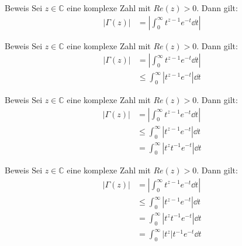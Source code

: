 \documentclass[10pt]{beamer}
\def\bC{\mathbb{C}}
\begin{document}
\begin{frame}{Beweis}
    Sei \( z \in \bC \) eine komplexe Zahl mit \( Re(z) > 0 \). Dann gilt:
    \begin{align*}
        \left\vert \Gamma( z ) \right\vert
        & = \left\vert \int_{0}^{\infty} t^{z - 1} e^{-t} \dd{t} \right\vert
    \end{align*}
\end{frame}



\begin{frame}{Beweis}
    Sei \( z \in \bC \) eine komplexe Zahl mit \( Re(z) > 0 \). Dann gilt:
    \begin{align*}
        \left\vert \Gamma( z ) \right\vert
        & = \left\vert \int_{0}^{\infty} t^{z - 1} e^{-t} \dd{t} \right\vert \\
        & \leq \int_{0}^{\infty} \left\vert t^{z - 1} e^{-t} \right\vert \dd{t}
    \end{align*}
\end{frame}



\begin{frame}{Beweis}
    Sei \( z \in \bC \) eine komplexe Zahl mit \( Re(z) > 0 \). Dann gilt:
    \begin{align*}
        \left\vert \Gamma( z ) \right\vert
        & = \left\vert \int_{0}^{\infty} t^{z - 1} e^{-t} \dd{t} \right\vert \\
        & \leq \int_{0}^{\infty} \left\vert t^{z - 1} e^{-t} \right\vert \dd{t} \\
        & = \int_{0}^{\infty} \left\vert t^{z}t^{-1} e^{-t} \right\vert \dd{t}
    \end{align*}
\end{frame}



\begin{frame}{Beweis}
    Sei \( z \in \bC \) eine komplexe Zahl mit \( Re(z) > 0 \). Dann gilt:
    \begin{align*}
        \left\vert \Gamma( z ) \right\vert
        & = \left\vert \int_{0}^{\infty} t^{z - 1} e^{-t} \dd{t} \right\vert \\
        & \leq \int_{0}^{\infty} \left\vert t^{z - 1} e^{-t} \right\vert \dd{t} \\
        & = \int_{0}^{\infty} \left\vert t^{z}t^{-1} e^{-t} \right\vert \dd{t} \\
        & = \int_{0}^{\infty} \left\vert t^{z} \right\vert t^{-1} e^{-t} \dd{t}
    \end{align*}
\end{frame}
\end{document}
